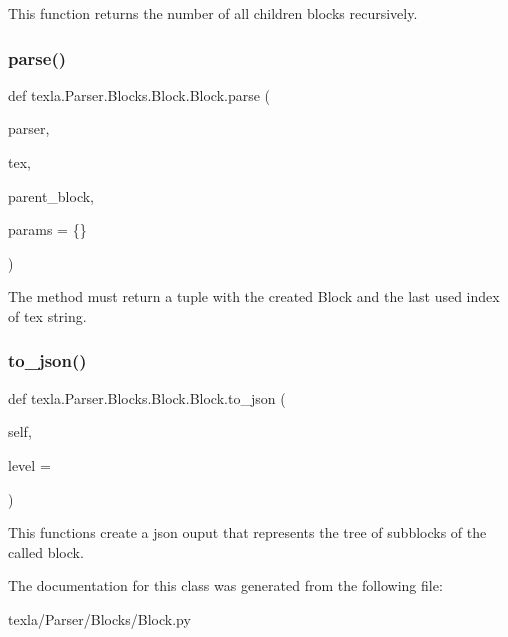 \begin{DoxyVerb}This function returns the
number of all children blocks recursively.\end{DoxyVerb}
 \hypertarget{classtexla_1_1Parser_1_1Blocks_1_1Block_1_1Block_a2a2862dcf38b90cf8ad1bbd4e7c8f266}{}\label{classtexla_1_1Parser_1_1Blocks_1_1Block_1_1Block_a2a2862dcf38b90cf8ad1bbd4e7c8f266} 
\subsubsection{\texorpdfstring{parse()}{parse()}}
{\footnotesize\ttfamily def texla.\+Parser.\+Blocks.\+Block.\+Block.\+parse (\begin{DoxyParamCaption}\item[{}]{parser,  }\item[{}]{tex,  }\item[{}]{parent\+\_\+block,  }\item[{}]{params = {\ttfamily \{\}} }\end{DoxyParamCaption})\hspace{0.3cm}{\ttfamily [static]}}

\begin{DoxyVerb}The method must return a tuple with the created
Block and the last used index of tex string.\end{DoxyVerb}
 \hypertarget{classtexla_1_1Parser_1_1Blocks_1_1Block_1_1Block_a80ef96fd4247bdaa6038eea0f5abf2cf}{}\label{classtexla_1_1Parser_1_1Blocks_1_1Block_1_1Block_a80ef96fd4247bdaa6038eea0f5abf2cf} 
\subsubsection{\texorpdfstring{to\+\_\+json()}{to\_json()}}
{\footnotesize\ttfamily def texla.\+Parser.\+Blocks.\+Block.\+Block.\+to\+\_\+json (\begin{DoxyParamCaption}\item[{}]{self,  }\item[{}]{level = {} }\end{DoxyParamCaption})}

\begin{DoxyVerb}This functions create a json ouput that
represents the tree of subblocks of the called block.
\end{DoxyVerb}
 

The documentation for this class was generated from the following file\+:\begin{DoxyCompactItemize}
\item 
texla/\+Parser/\+Blocks/Block.\+py\end{DoxyCompactItemize}
